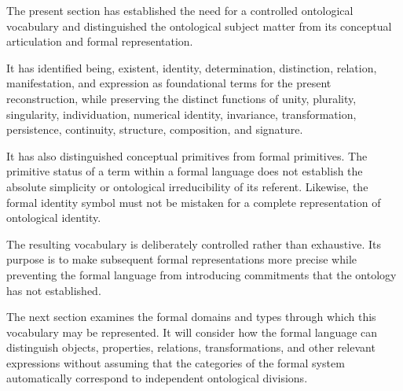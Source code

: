 The present section has established the
need for a controlled ontological vocabulary
and distinguished the ontological subject
matter from its conceptual articulation
and formal representation.

It has identified being, existent, identity,
determination, distinction, relation,
manifestation, and expression as foundational
terms for the present reconstruction, while
preserving the distinct functions of unity,
plurality, singularity, individuation,
numerical identity, invariance, transformation,
persistence, continuity, structure, composition,
and signature.

It has also distinguished conceptual primitives
from formal primitives. The primitive status
of a term within a formal language does not
establish the absolute simplicity or
ontological irreducibility of its referent.
Likewise, the formal identity symbol must
not be mistaken for a complete representation
of ontological identity.

The resulting vocabulary is deliberately
controlled rather than exhaustive. Its
purpose is to make subsequent formal
representations more precise while
preventing the formal language from
introducing commitments that the ontology
has not established.

The next section examines the formal domains
and types through which this vocabulary
may be represented. It will consider how
the formal language can distinguish objects,
properties, relations, transformations,
and other relevant expressions without
assuming that the categories of the formal
system automatically correspond to
independent ontological divisions.

